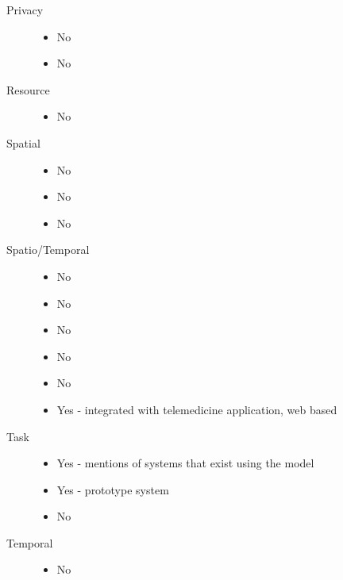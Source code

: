 \documentclass[letterpaper,10pt,english]{sphinxmanual}
\begin{document}
\begin{description}
\item[{Privacy}] \leavevmode\begin{itemize}
\item {} 
No

\item {} 
No

\end{itemize}

\item[{Resource}] \leavevmode\begin{itemize}
\item {} 
No

\end{itemize}

\item[{Spatial}] \leavevmode\begin{itemize}
\item {} 
No

\item {} 
No

\item {} 
No

\end{itemize}

\item[{Spatio/Temporal}] \leavevmode\begin{itemize}
\item {} 
No

\item {} 
No

\item {} 
No

\item {} 
No

\item {} 
No

\item {} 
Yes - integrated with telemedicine application, web based

\end{itemize}

\item[{Task}] \leavevmode\begin{itemize}
\item {} 
Yes - mentions of systems that exist using the model

\item {} 
Yes - prototype system

\item {} 
No

\end{itemize}

\item[{Temporal}] \leavevmode\begin{itemize}
\item {} 
No

\end{itemize}

\end{description}
\end{document}
